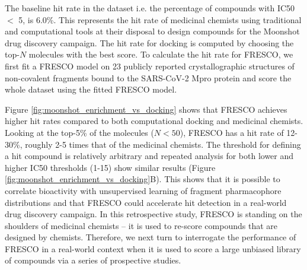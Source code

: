 The baseline hit rate in the dataset i.e. the percentage of compounds with IC50 $<$ 5\uM, is 6.0\%. This represents the hit rate of medicinal chemists using traditional and computational tools at their disposal to design compounds for the Moonshot drug discovery campaign. The hit rate for docking is computed by choosing the top-$N$ molecules with the best score. To calculate the hit rate for FRESCO, we first fit a FRESCO model on 23 publicly reported crystallographic structures of non-covalent fragments bound to the SARS-CoV-2 Mpro protein \cite{Douangamath2020XChem} and score the whole dataset using the fitted FRESCO model.


Figure \ref{fig:moonshot_enrichment_vs_docking} shows that FRESCO achieves higher hit rates compared to both computational docking and medicinal chemists. Looking at the top-5\% of the molecules ($N<50$), FRESCO has a hit rate of 12-30\%, roughly 2-5 times that of the medicinal chemists. The threshold for defining a hit compound is relatively arbitrary and repeated analysis for both lower and higher IC50 thresholds (1-15\uM) show similar results (Figure \ref{fig:moonshot_enrichment_vs_docking}B). This shows that it is possible to correlate bioactivity with unsupervised learning of fragment pharmacophore distributions and that FRESCO could accelerate hit detection in a real-world drug discovery campaign. In this retrospective study, FRESCO is standing on the shoulders of medicinal chemists -- it is used to re-score compounds that are designed by chemists. Therefore, we next turn to interrogate the performance of FRESCO in a real-world context when it is used to score a large unbiased library of compounds via a series of prospective studies. 


